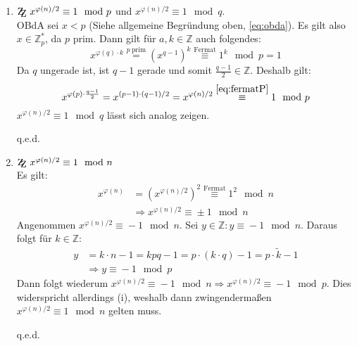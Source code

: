\documentclass[DIN, pagenumber=false, fontsize=11pt, parskip=half]{scrartcl}
\newcommand{\Z}[0]{\mathbb{Z}}
\newcommand{\ZZ}{\mathrm{Z\kern-.3em\raise-0.5ex\hbox{Z}}}
\newcommand{\congTo}[3][]{\stackrel{#1}{\equiv} #2\mod #3}
\newcommand{\Qed}{\begin{flushright}
    q.e.d.
\end{flushright}}
\begin{document}
    \begin{enumerate}[label=(\roman*)]
        \item $\ZZ \ x^{\varphi(n)/2} \congTo{1}{p}$ und $x^{\varphi(n)/2} \congTo{1}{q}$. \\
              OBdA sei $x < p$ (Siehe allgemeine Begründung oben, \cref{eq:obda}). Es gilt also $x \in \Z_p^*$, da $p$ prim. Dann gilt für $a, k \in \Z$
              auch folgendes:
              \begin{equation}
                  x^{\varphi(q) \cdot k} \stackrel{p \ \text{prim}}{=} \left(x^{q - 1}\right)^k \congTo[\text{Fermat}]{1^k}{p} = 1
                  \label{eq:fermatP}
              \end{equation}
              Da $q$ ungerade ist, ist $q - 1$ gerade und somit $\frac{q - 1}{2} \in \Z$. Deshalb gilt:
              \begin{equation}
                  x^{\varphi(p) \cdot \frac{q - 1}{2}} = x^{(p - 1) \cdot (q - 1) / 2} = x^{\varphi(n) / 2} \congTo[\ref{eq:fermatP}]{1}{p}
              \end{equation}
              $x^{\varphi(n)/2} \congTo{1}{q}$ lässt sich analog zeigen. \Qed
        \item $\ZZ \ x^{\varphi(n)/2} \congTo{1}{n}$ \\
              Es gilt:
              \begin{align}
                  x^{\varphi(n)} &= \left(x^{\varphi(n)/2}\right)^2 \congTo[\text{Fermat}]{1^2}{n} \\
                  &\Rightarrow x^{\varphi(n)/2} \congTo{\pm 1}{n}
              \end{align}
              Angenommen $x^{\varphi(n)/2} \congTo{-1}{n}$. Sei $y \in \Z : y \congTo{-1}{n}$. Daraus folgt für $k \in \Z$:
              \begin{align}
                  y &= k \cdot n - 1 = k p q - 1 = p \cdot (k \cdot q) - 1 = p \cdot \tilde{k} -1 \\
                  &\Rightarrow y \congTo{-1}{p} \label{eq:mOneInP}
              \end{align}
              Dann folgt wiederum $x^{\varphi(n)/2} \congTo{- 1}{n} \Rightarrow x^{\varphi(n)/2} \congTo{- 1}{p}$. Dies widerspricht allerdings (i), 
              weshalb dann zwingendermaßen $x^{\varphi(n)/2} \congTo{1}{n}$ gelten muss. \Qed
    \end{enumerate}
\end{document}
